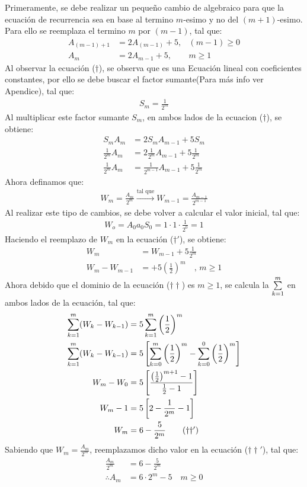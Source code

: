 Primeramente, se debe realizar un pequeño cambio de algebraico para que la ecuación de recurrencia sea en base al termino $m$-esimo y no del $(m+1)$-esimo.
Para ello se reemplaza el termino $m$ por $(m-1)$, tal que:
\begin{align*}
     A_{(m-1)+1} &= 2A_{(m-1)} +5, & (m-1)\ge0 \\
     A_m &= 2A_{m-1} +5, & m \ge1 \tag{$\dagger$}
\end{align*}
Al observar la ecuación ($\dagger$), se observa que es una Ecuación lineal con coeficientes constantes, por ello se debe buscar el factor sumante(Para más info ver Apendice), tal que:
\begin{align*}
    S_m = \frac{1}{2^m}
\end{align*}
Al multiplicar este factor sumante $S_m$, en ambos lados de la ecuacion ($\dagger$), se obtiene:
\begin{align*}
    S_m A_m &= 2S_mA_{m-1} +5S_m \\
    \frac{1}{2^m} A_m &= 2\frac{1}{2^m}A_{m-1} +5\frac{1}{2^m} \\
    \frac{1}{2^m} A_m &= \frac{1}{2^{m-1}}A_{m-1} +5\frac{1}{2^m} \tag{$\dagger '$}
\end{align*}
Ahora definamos que:
\begin{align*}
    W_m = \frac{A_m}{2^m} \xrightarrow{\text{tal que}} W_{m-1} = \frac{A_{m-1}}{2^{m-1}}
\end{align*}
Al realizar este tipo de cambios, se debe volver a calcular el valor inicial, tal que:
\begin{align*}
    W_o = A_0 a_0 S_0 = 1 \cdot 1 \cdot \frac{1}{2^0} = 1 
\end{align*}
Haciendo el reemplazo de $W_m$ en la ecuación ($\dagger '$), se obtiene:
\begin{align*}
    W_m &= W_{m-1} +5 \frac{1}{2^m} \\
    W_m - W_{m-1} &=  +5 \left(\frac{1}{2}\right)^m \quad \text{, } m \ge 1 \tag{$\dagger \dagger$}
\end{align*}
Ahora debido que el dominio de la ecuación ({$\dagger \dagger$}) es $m \ge 1$, se calcula la $\sum\limits_{k=1}^{m}$ en ambos lados de la ecuación, tal que:
\begin{align*}
\sum\limits_{k=1}^{m} (W_k -  W_{k-1}) &= 5\sum\limits_{k=1}^{m} \left(\frac{1}{2}\right)^m \\ 
\sum\limits_{k=1}^{m} (W_k -  W_{k-1}) &= 5 \left[ \sum\limits_{k=0}^{m} \left(\frac{1}{2}\right)^m - \sum\limits_{k=0}^{0}\left(\frac{1}{2}\right)^m \right]  \\ 
W_m -  W_0 &= 5 \left[ \frac{\left(\frac{1}{2}\right)^{m+1}-1}{\frac{1}{2}-1} \right]  \\
W_m -  1 &= 5 \left[ 2 - \frac{1}{2^m} -1 \right]  \\
W_m &= 6 - \frac{5}{2^m} \tag{$\dagger\dagger '$}
\end{align*} 
Sabiendo que $W_m = \frac{A_m}{2^m}$, reemplazamos dicho valor en la ecuación ($\dagger\dagger'$), tal que:
\begin{align*}
    \frac{A_m}{2^m} &= 6 - \frac{5}{2^m}\\
    \therefore A_m &= 6 \cdot 2^m - 5 \quad m \ge 0\\
\end{align*}